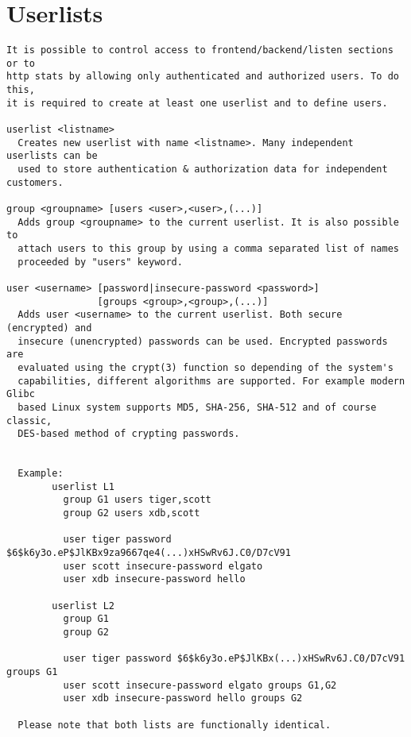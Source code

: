 
\section{Userlists}

\begin{verbatim}
It is possible to control access to frontend/backend/listen sections or to
http stats by allowing only authenticated and authorized users. To do this,
it is required to create at least one userlist and to define users.

userlist <listname>
  Creates new userlist with name <listname>. Many independent userlists can be
  used to store authentication & authorization data for independent customers.

group <groupname> [users <user>,<user>,(...)]
  Adds group <groupname> to the current userlist. It is also possible to
  attach users to this group by using a comma separated list of names
  proceeded by "users" keyword.

user <username> [password|insecure-password <password>]
                [groups <group>,<group>,(...)]
  Adds user <username> to the current userlist. Both secure (encrypted) and
  insecure (unencrypted) passwords can be used. Encrypted passwords are
  evaluated using the crypt(3) function so depending of the system's
  capabilities, different algorithms are supported. For example modern Glibc
  based Linux system supports MD5, SHA-256, SHA-512 and of course classic,
  DES-based method of crypting passwords.


  Example:
        userlist L1
          group G1 users tiger,scott
          group G2 users xdb,scott

          user tiger password $6$k6y3o.eP$JlKBx9za9667qe4(...)xHSwRv6J.C0/D7cV91
          user scott insecure-password elgato
          user xdb insecure-password hello

        userlist L2
          group G1
          group G2

          user tiger password $6$k6y3o.eP$JlKBx(...)xHSwRv6J.C0/D7cV91 groups G1
          user scott insecure-password elgato groups G1,G2
          user xdb insecure-password hello groups G2

  Please note that both lists are functionally identical.

\end{verbatim}
